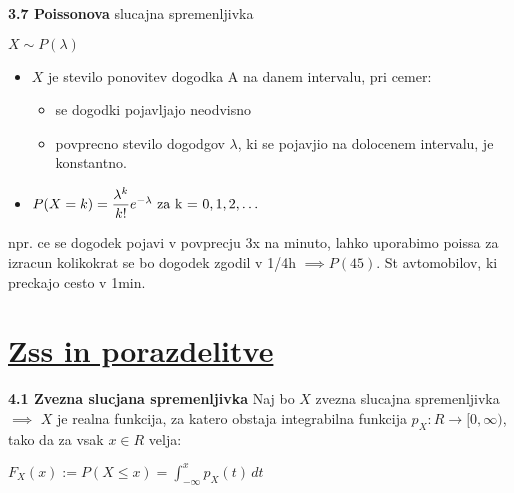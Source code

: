 \documentclass{article}
\begin{document}
\begin{multicols}{3}
\textbf{3.7 Poissonova} slucajna spremenljivka
\begin{center}
    \begin{math}
        X \sim P(\lambda)
    \end{math}
\end{center}
\begin{itemize}
    \item $X$ je stevilo ponovitev dogodka A na danem intervalu, pri cemer:
        \begin{itemize}
            \item se dogodki pojavljajo neodvisno
            \item povprecno stevilo dogodgov $\lambda$, ki se pojavjio na dolocenem intervalu, je konstantno.
        \end{itemize}
    \item \begin{math}
        P(X = k) =  \dfrac{ \lambda^{k} }{k!} e^{- \lambda}$ za k = $ 0,1,2,\dots
    \end{math}
\end{itemize}
npr. ce se dogodek pojavi v povprecju 3x na minuto, lahko uporabimo poissa za izracun
kolikokrat se bo dogodek zgodil v  1/4h $\implies P(45)$. St avtomobilov, ki preckajo cesto v 1min.

\section{\underline{Zss in porazdelitve}}

\textbf{4.1 Zvezna slucjana spremenljivka}
Naj bo $X$ zvezna slucajna spremenljivka $\implies$ $X$ je realna funkcija,
za katero obstaja integrabilna funkcija $p_{X}: R \rightarrow [0, \infty)$,
tako da za vsak $x \in R$ velja:

\begin{center}
    \begin{math}
        F_{X}(x) := P(X \leq x) = \int_{- \infty}^{x} p_{X}(t) \,dt
    \end{math}
\end{center}


\end{multicols}
\end{document}
